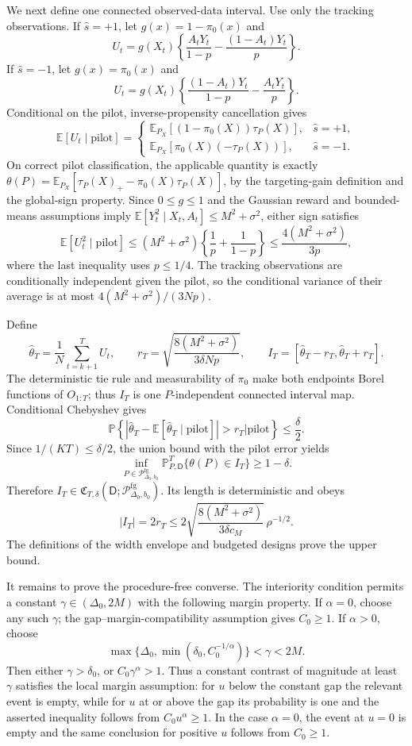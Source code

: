 We next define one connected observed-data interval.  Use only the tracking
observations.  If \(\widehat s=+1\), let \(g(x)=1-\pi_0(x)\) and
\[
 U_t=g(X_t)\left\{
 \frac{A_tY_t}{1-p}-\frac{(1-A_t)Y_t}{p}
 \right\}.
\]
If \(\widehat s=-1\), let \(g(x)=\pi_0(x)\) and
\[
 U_t=g(X_t)\left\{
 \frac{(1-A_t)Y_t}{1-p}-\frac{A_tY_t}{p}
 \right\}.
\]
Conditional on the pilot, inverse-propensity cancellation gives
\[
 \mathbb E[U_t\mid\text{pilot}]
 =\begin{cases}
 \mathbb E_{P_X}[(1-\pi_0(X))\tau_P(X)],&\widehat s=+1,\\
 \mathbb E_{P_X}[\pi_0(X)(-\tau_P(X))],&\widehat s=-1.
 \end{cases}
\]
On correct pilot classification, the applicable quantity is exactly
\(\theta(P)=\mathbb E_{P_X}[\tau_P(X)_+-\pi_0(X)\tau_P(X)]\), by the
targeting-gain definition and the global-sign property.  Since
\(0\leq g\leq1\) and the Gaussian reward and bounded-means assumptions imply
\(\mathbb E[Y_t^2\mid X_t,A_t]\leq M^2+\sigma^2\), either sign satisfies
\[
 \mathbb E[U_t^2\mid\text{pilot}]
 \leq(M^2+\sigma^2)\left\{\frac1p+\frac1{1-p}\right\}
 \leq\frac{4(M^2+\sigma^2)}{3p},
\]
where the last inequality uses \(p\leq1/4\).  The tracking observations are
conditionally independent given the pilot, so the conditional variance of
their average is at most \(4(M^2+\sigma^2)/(3Np)\).

Define
\[
 \widehat\theta_T=\frac1N\sum_{t=k+1}^T U_t,
 \qquad
 r_T=\sqrt{\frac{8(M^2+\sigma^2)}{3\delta Np}},
 \qquad
 I_T=[\widehat\theta_T-r_T,\widehat\theta_T+r_T].
\]
The deterministic tie rule and measurability of \(\pi_0\) make both endpoints
Borel functions of \(O_{1:T}\); thus \(I_T\) is one \(P\)-independent
connected interval map.  Conditional Chebyshev gives
\[
 \mathbb P\left\{
 |\widehat\theta_T-\mathbb E[\widehat\theta_T\mid\text{pilot}]|>r_T
 \mathrel{\big|}\text{pilot}
 \right\}\leq\frac\delta2.
\]
Since \(1/(KT)\leq\delta/2\), the union bound with the pilot error yields
\[
 \inf_{P\in\mathcal P_{\Delta_0,b_0}^{\mathrm{fg}}}
 \mathbb P_{P,\mathsf D}^{T}\{\theta(P)\in I_T\}
 \geq1-\delta.
\]
Therefore
\(I_T\in\mathfrak C_{T,\delta}(\mathsf D;
\mathcal P_{\Delta_0,b_0}^{\mathrm{fg}})\).  Its length is deterministic and
obeys
\[
 |I_T|=2r_T
 \leq
 2\sqrt{\frac{8(M^2+\sigma^2)}{3\delta c_M}}\,\rho^{-1/2}.
\]
The definitions of the width envelope and budgeted designs prove the upper
bound.

It remains to prove the procedure-free converse.  The interiority condition
permits a constant \(\gamma\in(\Delta_0,2M)\) with the following margin
property.  If \(\alpha=0\), choose any such \(\gamma\); the
gap--margin-compatibility assumption gives \(C_0\geq1\).  If \(\alpha>0\),
choose
\[
 \max\{\Delta_0,\min(\delta_0,C_0^{-1/\alpha})\}<\gamma<2M.
\]
Then either \(\gamma>\delta_0\), or
\(C_0\gamma^\alpha>1\).  Thus a constant contrast of magnitude at least
\(\gamma\) satisfies the local margin assumption: for \(u\) below the
constant gap the relevant event is empty, while for \(u\) at or above the gap
its probability is one and the asserted inequality follows from
\(C_0u^\alpha\geq1\).  In the case \(\alpha=0\), the event at \(u=0\) is
empty and the same conclusion for positive \(u\) follows from \(C_0\geq1\).

